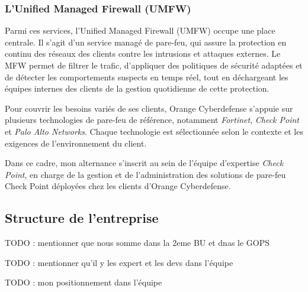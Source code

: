 \subsubsection{L'Unified Managed Firewall (UMFW)}

Parmi ces services, l'Unified Managed Firewall (UMFW) occupe une place centrale. Il s'agit d'un service managé de pare-feu, qui assure la protection en continu des réseaux des clients contre les intrusions et attaques externes. Le MFW permet de filtrer le trafic, d'appliquer des politiques de sécurité adaptées et de détecter les comportements suspects en temps réel, tout en déchargeant les équipes internes des clients de la gestion quotidienne de cette protection.

Pour couvrir les besoins variés de ses clients, Orange Cyberdefense s'appuie sur plusieurs technologies de pare-feu de référence, notamment \textit{Fortinet}, \textit{Check Point} et \textit{Palo Alto Networks}. Chaque technologie est sélectionnée selon le contexte et les exigences de l'environnement du client.

Dans ce cadre, mon alternance s'inscrit au sein de l'équipe d'expertise \textit{Check Point}, en charge de la gestion et de l'administration des solutions de pare-feu Check Point déployées chez les clients d'Orange Cyberdefense.

\subsection{Structure de l'entreprise}
TODO : mentionner que nous somme dans la 2eme BU et dnas le GOPS

TODO : mentionner qu'il y les expert et les devs dans l'équipe

TODO : mon positionnement dans l'équipe